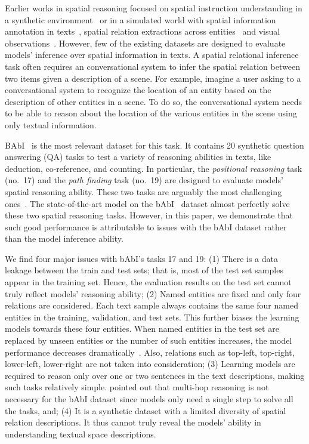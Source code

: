 \documentclass[letterpaper]{article} \usepackage{aaai22}  \usepackage{times}  \usepackage{helvet}  \usepackage{courier}  \usepackage[hyphens]{url}  \usepackage{graphicx} \urlstyle{rm} \def\UrlFont{\rm}  \usepackage{natbib}  \usepackage{caption} \DeclareCaptionStyle{ruled}{labelfont=normalfont,labelsep=colon,strut=off} \frenchspacing  \setlength{\pdfpagewidth}{8.5in}  \setlength{\pdfpageheight}{11in}  \usepackage{algorithm}
\begin{document}
Earlier works in spatial reasoning focused on spatial instruction understanding in a synthetic environment~\cite{bisk2018learning, tan2018source, janner2018representation} or in a simulated world with spatial information annotation in texts~\cite{pustejovsky2015semeval}, spatial relation extractions across entities~\cite{petruck2018representing} and visual observations~\cite{anderson2018vision, chen2019touchdown}. 
However, few of the existing datasets are designed to evaluate models' inference over spatial information in texts. A spatial relational inference task often requires an conversational system to infer the spatial relation between two items given a description of a scene. For example, imagine a user asking to a conversational system to recognize the location of an entity based on the description of other entities in a scene. To do so, the conversational system needs to be able to reason about the location of the various entities in the scene using only textual information.



BAbI~\cite{weston2015towards} is the most relevant dataset for this task. It contains 20 synthetic question answering (QA) tasks to test a variety of reasoning abilities in texts, 
like deduction, co-reference, and counting. 
In particular, the \textit{positional reasoning} task (no.~17) and the \textit{path finding} task (no.~19) are designed to evaluate models' spatial reasoning ability.
These two tasks are arguably the most challenging ones~\citet{van2019does}. 
The state-of-the-art model on the bAbI~\cite{le2020self} dataset almost perfectly solve these two spatial reasoning tasks. 
However, in this paper, we demonstrate that such good performance is attributable to issues with the bAbI dataset rather than the model inference ability.

We find four major issues with bAbI's tasks 17 and 19: 
(1) 
There is a data leakage between the train and test sets; that is, most of the test set samples appear in the training set. Hence, the evaluation results on the test set cannot truly reflect models' reasoning ability; 
(2) 
Named entities are fixed and only four relations are considered. Each text sample always contains the same four named entities in the training, validation, and test sets. This further biases the learning models towards these four entities. When named entities in the test set are replaced by unseen entities or the number of such entities increases, the model performance decreases dramatically~\cite{chen2020unseen}. Also, relations such as top-left, top-right, lower-left, lower-right are not taken into consideration;
(3) 
Learning models are required to reason only over one or two sentences in the text descriptions, making such tasks relatively simple. \citet{palm2018recurrent} pointed out that multi-hop reasoning is not necessary for the bAbI dataset since models only need a single step to solve all the tasks, and;
(4) It is a synthetic dataset with a limited diversity of spatial relation descriptions. It thus cannot truly reveal the models' ability in understanding textual space descriptions.
\end{document}
